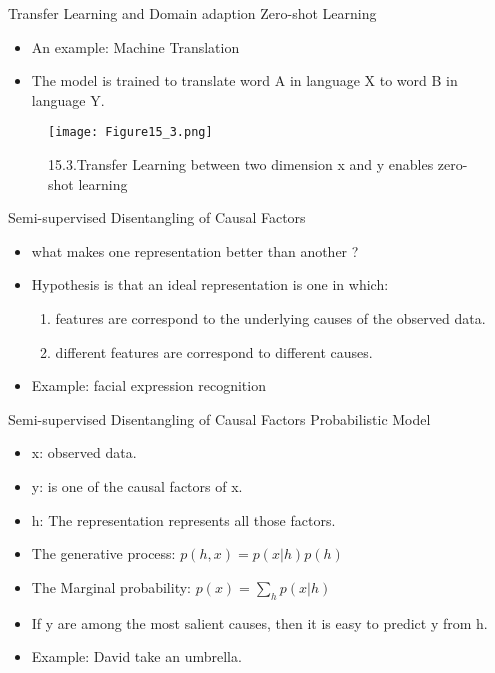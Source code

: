 \begin{frame}{Transfer Learning and Domain adaption}
Zero-shot Learning
\begin{itemize}
   \item An example: Machine Translation
   \item The model is trained to translate word A in language X to word B in language Y.
\end{itemize}
\begin{figure}[t]
\centering
\texttt{[image: Figure15\_3.png]} %
\caption{15.3.Transfer Learning between two dimension x and y enables zero-shot learning}
\end{figure}
\end{frame}

\begin{frame}{Semi-supervised Disentangling of Causal Factors}
\begin{itemize}
  \item what makes one representation better than another ?
  \item Hypothesis is that an ideal representation is one in which:
   \begin{enumerate} %
   \item features are correspond to the underlying causes of the observed data.
   \item different features are correspond to different causes.
   \end{enumerate}
  \item Example: facial expression recognition
\end{itemize}
\end{frame}

\begin{frame}{Semi-supervised Disentangling of Causal Factors}
Probabilistic Model
\begin{itemize}
  \item x: observed data.
  \item y: is one of the causal factors of x.
  \item h: The representation represents all those factors.
  \item The generative process: $ p(h,x) = p(x|h)p(h) $
  \item The Marginal probability: $ p(x) = \sum\limits_{h} p(x|h) $
  \item If y are among the most salient causes, then it is easy to predict y from h.
  \item Example: David take an umbrella.
\end{itemize}
\end{frame}


